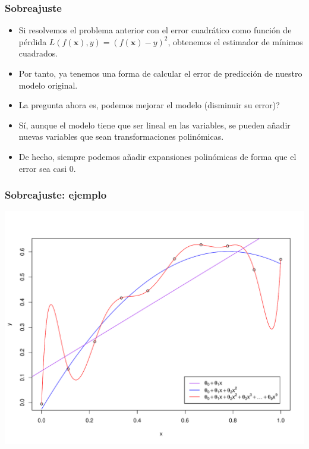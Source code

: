 \documentclass{beamer}
\newcommand{\xbf}{\ensuremath{\mathbf{x}}}
\begin{document}
\begin{frame}
\frametitle{Sobreajuste}

\begin{itemize}
\item Si resolvemos el problema anterior con el error cuadrático como función de pérdida $L(f(\xbf), y) = (f(\xbf)-y)^2$, obtenemos el estimador de mínimos cuadrados.

\item Por tanto, ya tenemos una forma de calcular el error de predicción de nuestro modelo original.

\item La pregunta ahora es, podemos mejorar el modelo (disminuir su error)?

\item Sí, aunque el modelo tiene que ser lineal en las variables, se pueden añadir nuevas variables que sean transformaciones polinómicas.

\item De hecho, siempre podemos añadir expansiones polinómicas de forma que el error sea casi $0$.
\end{itemize}
\end{frame}


\begin{frame}
\frametitle{Sobreajuste: ejemplo}
\centering
\includegraphics[height=0.85\textheight]{overfit1.pdf}
\end{frame}
\end{document}
